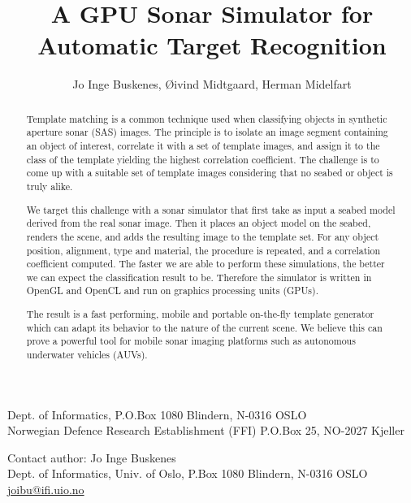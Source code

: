 \documentclass[
   UAM                                          %
 , 12pt                                         %
 , bibtex                                       %
 , layout
]{common/mytemplate}
\begin{document}
% 

\pagestyle{plain}



\title{A GPU Sonar Simulator for Automatic Target Recognition}%
%
\author{Jo Inge Buskenes\firstAddress, \O{}ivind Midtgaard\secondAddress, Herman Midelfart\secondAddress}%
%
\begin{contact}
  \firstAddress Dept. of Informatics, P.O.Box 1080 Blindern, N-0316 OSLO\\
  \secondAddress Norwegian Defence Research Establishment (FFI) P.O.Box 25, NO-2027 Kjeller
\end{contact}%
%
\begin{contact}
Contact author: Jo Inge Buskenes\\
Dept. of Informatics, Univ. of Oslo, P.Box 1080 Blindern, N-0316 OSLO\\
\href{mailto:joibu@ifi.uio.no}{joibu@ifi.uio.no}
\end{contact}%
%
\begin{abstract}
Template matching is a common technique used when classifying objects in synthetic aperture sonar (SAS) images. The principle is to isolate an image segment containing an object of interest, correlate it with a set of template images, and assign it to the class of the template yielding the highest correlation coefficient. The challenge is to come up with a suitable set of template images considering that no seabed or object is truly alike.

We target this challenge with a sonar simulator that first take as input a seabed model derived from the real sonar image. Then it places an object model on the seabed, renders the scene, and adds the resulting image to the template set. For any object position, alignment, type and material, the procedure is repeated, and a correlation coefficient computed. The faster we are able to perform these simulations, the better we can expect the classification result to be. Therefore the simulator is written in OpenGL and OpenCL and run on graphics processing units (GPUs).

The result is a fast performing, mobile and portable on-the-fly template generator which can adapt its behavior to the nature of the current scene. We believe this can prove a powerful tool for mobile sonar imaging platforms such as autonomous underwater vehicles (AUVs).
\end{abstract}%
%
\end{document}
